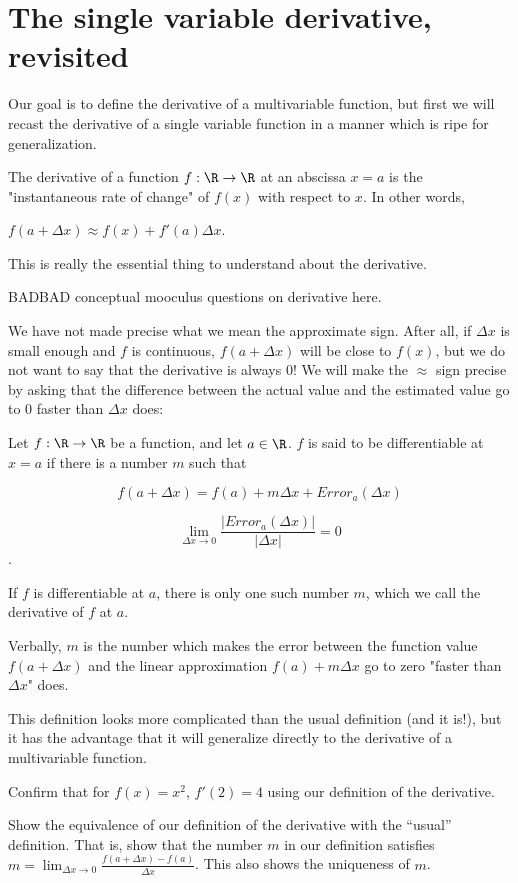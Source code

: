 
\section{The single variable derivative, revisited}
	
	Our goal is to define the derivative of a multivariable function, but first we will recast the derivative of a single variable function in a
	manner which is ripe for generalization.
	
	The derivative of a function $f:\R \to \R$ at an abscissa $x = a$ is the "instantaneous rate of change" of $f(x)$ with respect to $x$.
	In other words, 
	
	$f(a + \Delta x) \approx f(x) +f'(a)\Delta x$.
	
	This is really the essential thing to understand about the derivative.
	
	BADBAD conceptual mooculus questions on derivative here.
	
	We have not made precise what we mean the approximate sign.  After all, if $\Delta x$ is small enough and $f$ is continuous, 
	$f(a+\Delta x)$ will be close to $f(x)$, but we do not want to say that the derivative is always $0$!  We will make the  $\approx$ sign precise by asking that the difference 
	between the actual value and the estimated value go to $0$ faster than $\Delta x$ does:
	
	\begin{definition}
		Let $f: \R \to \R$ be a function, and let $a \in \R$.  $f$ is said to be differentiable at $x=a$ if there is a number $m$ such that 
		
		\[ f(a+\Delta x) = f(a) + m\Delta x + Error_a(\Delta x)\]
		
		\[ \lim_{\Delta x \to 0} \frac{\left|Error_a(\Delta x)|}{\left|\Delta x\right|} = 0 \].
		
		If $f$ is differentiable at $a$, there is only one such number $m$, which we call the derivative of $f$ at $a$.  
		
		Verbally,  $m$ is the number which makes the error between the function value $f(a+\Delta x)$ and the linear approximation $f(a)+m\Delta x$ go to zero 
		"faster than $\Delta x$" does.
	\end{definition}
	
	This definition looks more complicated than the usual definition (and it is!), but it has the advantage that it will 
	generalize directly to the derivative of a multivariable function.
	
	\begin{question}
		Confirm that for $f(x)=x^2$, $f'(2)=4$ using our definition of the derivative.
	\end{question}
	
	\begin{question}
		Show the equivalence of our definition of the derivative with the ``usual'' definition.  That is, show that the number $m$ in our definition satisfies
		$m = \lim_{\Delta x \to 0}\frac{f(a+\Delta x)-f(a)}{\Delta x}$.  This also shows the uniqueness of $m$.
	\end{question}
	
	